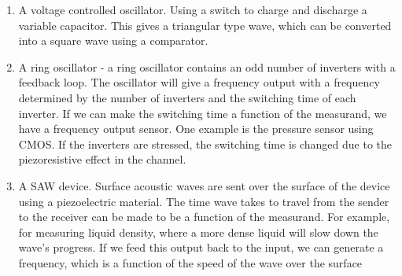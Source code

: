 \documentclass[10pt,a4paper]{article}
\begin{document}

\begin{enumerate}

	\item A voltage controlled oscillator. Using a switch to charge and discharge a variable capacitor. This gives a triangular type wave, which can be converted into a square wave using a comparator.
	\item A ring oscillator - a ring oscillator contains an odd number of inverters with a feedback loop. The oscillator will give a frequency output with a frequency determined by the number of inverters and the switching time of each inverter. If we can make the switching time a function of the measurand, we have a frequency output sensor. One example is the pressure sensor using CMOS. If the inverters are stressed, the switching time is changed due to the piezoresistive effect in the channel.
	\item A SAW device. Surface acoustic waves are sent over the surface of the device using a piezoelectric material. The time wave takes to travel from the sender to the receiver can be made to be a function of the measurand. For example, for measuring liquid density, where a more dense liquid will slow down the wave's progress. If we feed this output back to the input, we can generate a frequency, which is a function of the speed of the wave over the surface
\end{enumerate}
\end{document}
